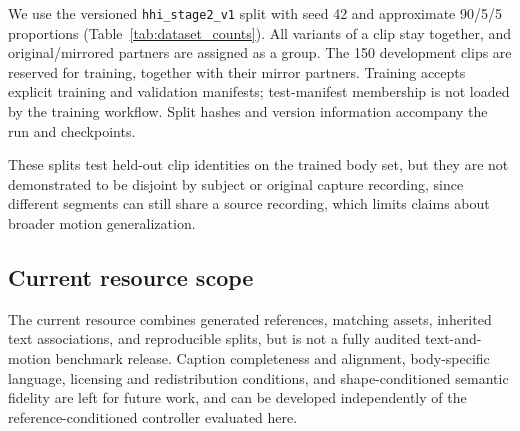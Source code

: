We use the versioned \texttt{hhi\_stage2\_v1} split with seed 42 and approximate
90/5/5 proportions (Table~\ref{tab:dataset_counts}). All variants of a clip
stay together, and original/mirrored partners are assigned as a group.
The 150 development clips are reserved for training, together with their
mirror partners. Training accepts explicit training and validation manifests;
test-manifest membership is not loaded by the training workflow. Split hashes
and version information accompany the run and checkpoints.

These splits test held-out clip identities on the trained body set, but they
are not demonstrated to be disjoint by subject or original capture recording,
since different segments can still share a source recording, which limits
claims about broader motion generalization.

\subsection{Current resource scope}

The current resource combines generated references, matching assets, inherited
text associations, and reproducible splits, but is not a fully audited
text-and-motion benchmark release. Caption completeness and alignment,
body-specific language, licensing and redistribution conditions, and
shape-conditioned semantic fidelity are left for future work, and can be
developed independently of the reference-conditioned controller evaluated
here.
